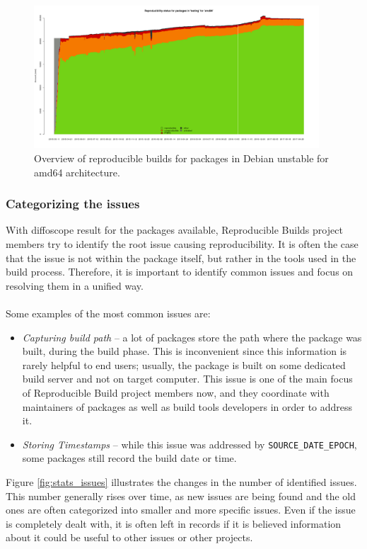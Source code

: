 {\begin{figure}
\centering
\includegraphics[width=0.95\textwidth]{fig/stats_pkg_state.png}
\caption{\label{fig:stats_sid}Overview of reproducible builds for packages in Debian unstable for amd64 architecture.}
\end{figure}

\subsubsection[Categorizing the issues]{Categorizing the issues} 
With diffoscope result for the packages available, Reproducible Builds project members try to identify the root issue causing reproducibility. It is often the case that the issue is not within the package itself, but rather in the tools used in the build process. Therefore, it is important to identify common issues and focus on resolving them in a unified way.\\\\
Some examples of the most common issues are:
\begin{itemize}[noitemsep]
\item \textit{Capturing build path} -- a lot of packages store the path where the package was built, during the build phase. This is inconvenient since this information is rarely helpful to end users; usually, the package is built on some dedicated build server and not on target computer. This issue is one of the main focus of Reproducible Build project members now, and they coordinate with maintainers of packages as well as build tools developers in order to address it.
\item \textit{Storing Timestamps} -- while this issue was addressed by \texttt{SOURCE\_DATE\_EPOCH}, some packages still record the build date or time.
\end{itemize}
Figure \ref{fig:stats_issues} illustrates the changes in the number of identified issues. This number generally rises over time, as new issues are being found and the old ones are often categorized into smaller and more specific issues. Even if the issue is completely dealt with, it is often left in records if it is believed information about it could be useful to other issues or other projects.\\\\

}
